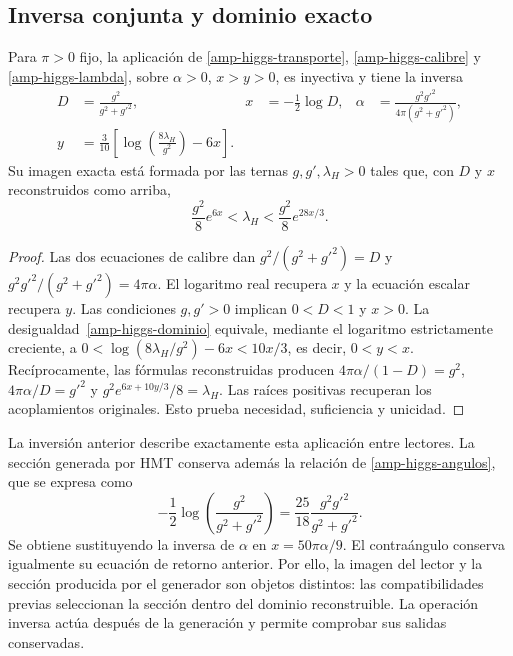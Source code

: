 \subsection{Inversa conjunta y dominio exacto}

\begin{theorem}
\label{amp-higgs-inversa-teorema}
Para $\pi>0$ fijo, la aplicación de
\eqref{amp-higgs-transporte}, \eqref{amp-higgs-calibre} y
\eqref{amp-higgs-lambda}, sobre $\alpha>0$, $x>y>0$, es inyectiva y tiene
la inversa
\begin{equation}
 \begin{aligned}
 D&=\frac{g^2}{g^2+g'^2},&
 x&=-\frac12\log D,&
 \alpha&=\frac{g^2g'^2}{4\pi(g^2+g'^2)},\\
 y&=\frac3{10}\left[\log\!\left(\frac{8\lambda_H}{g^2}\right)-6x\right].
 \end{aligned}
 \label{amp-higgs-inversa}
\end{equation}
Su imagen exacta está formada por las ternas $g,g',\lambda_H>0$ tales que,
con $D$ y $x$ reconstruidos como arriba,
\begin{equation}
 \frac{g^2}{8}e^{6x}<\lambda_H<\frac{g^2}{8}e^{28x/3}.
 \label{amp-higgs-dominio}
\end{equation}
\end{theorem}
\begin{proof}
Las dos ecuaciones de calibre dan
$g^2/(g^2+g'^2)=D$ y
$g^2g'^2/(g^2+g'^2)=4\pi\alpha$. El logaritmo real recupera $x$ y
la ecuación escalar recupera $y$. Las condiciones $g,g'>0$ implican
$0<D<1$ y $x>0$. La desigualdad~\eqref{amp-higgs-dominio} equivale,
mediante el logaritmo estrictamente creciente, a
$0<\log(8\lambda_H/g^2)-6x<10x/3$, es decir, $0<y<x$.
Recíprocamente, las fórmulas reconstruidas producen
$4\pi\alpha/(1-D)=g^2$, $4\pi\alpha/D=g'^2$ y
$g^2e^{6x+10y/3}/8=\lambda_H$. Las raíces positivas recuperan los
acoplamientos originales. Esto prueba necesidad, suficiencia y unicidad.
\end{proof}

La inversión anterior describe exactamente esta aplicación entre lectores.
La sección generada por HMT conserva además la relación de
\eqref{amp-higgs-angulos}, que se expresa como
\begin{equation}
 -\frac12\log\!\left(\frac{g^2}{g^2+g'^2}\right)
 =\frac{25}{18}\frac{g^2g'^2}{g^2+g'^2}.
 \label{amp-higgs-compatibilidad-alpha}
\end{equation}
Se obtiene sustituyendo la inversa de $\alpha$ en $x=50\pi\alpha/9$.
El contraángulo conserva igualmente su ecuación de retorno anterior.
Por ello, la imagen del lector y la sección producida por el generador
son objetos distintos: las compatibilidades previas seleccionan la sección
dentro del dominio reconstruible. La operación inversa actúa después de
la generación y permite comprobar sus salidas conservadas.

